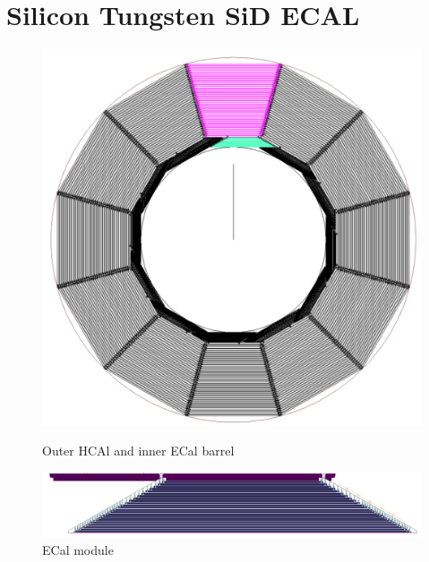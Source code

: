 \section{Silicon Tungsten SiD ECAL}
\begin{figure}
	\centering
	\begin{minipage}[b]{.49\textwidth}
		\includegraphics[width=\linewidth]{Calorimeter/SiliconTungstenSiD/cross_section}
		\caption{Outer HCAl and inner ECal barrel}
		\label{fig:Calorimeter:SiDECAL:crosssection}
	\end{minipage}\hfill
	\begin{minipage}[b]{.49\textwidth}
		\includegraphics[width=\linewidth]{Calorimeter/SiliconTungstenSiD/ecalModule}
		\caption{ECal module}
		\label{fig:Calorimeter:SiDECAL:ecalModule}
	\end{minipage}
\end{figure}
